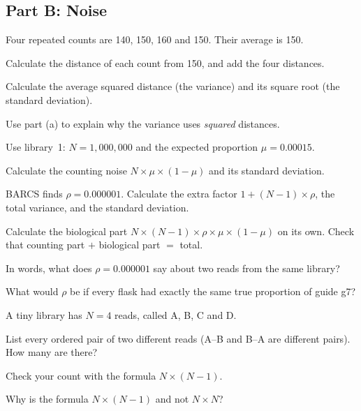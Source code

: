 \subsection*{Part B: Noise}
\begin{exlist}[resume*=ex1]
\item \tagcalc{} \tagexplain{} Four repeated counts are 140, 150, 160 and
150. Their average is 150.
\begin{parts}
\item Calculate the distance of each count from 150, and add the four
  distances.
\item Calculate the average squared distance (the variance) and its square
  root (the standard deviation).
\item Use part (a) to explain why the variance uses \emph{squared}
  distances.
\end{parts}

\item \tagcalc{} Use library~1: $N = 1{,}000{,}000$ and the expected
proportion $\mu = 0.00015$.
\begin{parts}
\item Calculate the counting noise $N \times \mu \times (1-\mu)$ and its
  standard deviation.
\item BARCS finds $\rho = 0.000001$. Calculate the extra factor
  $1 + (N-1) \times \rho$, the total variance, and the standard deviation.
\item Calculate the biological part
  $N \times (N-1) \times \rho \times \mu \times (1-\mu)$ on its own. Check
  that counting part $+$ biological part $=$ total.
\end{parts}

\item \tagexplain
\begin{parts}
\item In words, what does $\rho = 0.000001$ say about two reads from the
  same library?
\item What would $\rho$ be if every flask had exactly the same true
  proportion of guide g7?
\end{parts}

\item \tagcalc{} \tagexplain{} A tiny library has $N = 4$ reads, called
A, B, C and D.
\begin{parts}
\item List every ordered pair of two different reads (A--B and B--A are
  different pairs). How many are there?
\item Check your count with the formula $N \times (N-1)$.
\item Why is the formula $N \times (N-1)$ and not $N \times N$?
\end{parts}


\end{exlist}
